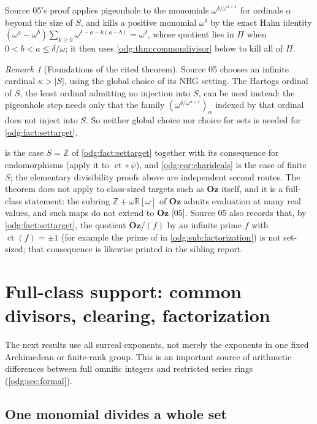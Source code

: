 \documentclass[11pt,oneside]{article}
\numberwithin{equation}{section}
\theoremstyle{definition}
\theoremstyle{remark}
\newtheorem{remark}[remark]{Remark}
\newcommand{\Oz}{\mathbf{Oz}}
\newcommand{\Z}{\mathbb Z}
\newcommand{\R}{\mathbb R}
\newcommand{\ct}{\operatorname{ct}}
\newcommand{\src}[1]{\textup{\textsf{\small[#1]}}}
\begin{document}
Source 05's proof applies pigeonhole to the monomials
$\omega^{\delta/\omega^{\alpha+1}}$ for ordinals $\alpha$ beyond the size of
$S$, and kills a positive monomial $\omega^\delta$ by the exact Hahn identity
$(\omega^a-\omega^b)\sum_{k\ge0}\omega^{\delta-a-k(a-b)}=\omega^\delta$, whose
quotient lies in $\Pi$ when $0<b<a\le\delta/\omega$; it then uses
\cref{odg:thm:commondivisor} below to kill all of $\Pi$.

\begin{remark}[Foundations of the cited theorem]\label{odg:rem:hartogs}
Source 05 chooses an infinite cardinal $\kappa>|S|$, using the global choice
of its NBG setting. The Hartogs ordinal of $S$, the least ordinal admitting no
injection into $S$, can be used instead: the pigeonhole step needs only that
the family $(\omega^{\delta/\omega^{\alpha+1}})_\alpha$ indexed by that ordinal
does not inject into $S$. So neither global choice nor choice for sets is
needed for \cref{odg:fact:settarget}.
\end{remark}

 is the case $S=\Z$ of \cref{odg:fact:settarget}
together with its consequence for endomorphisms (apply it to
$\ct\circ\psi$), and \cref{odg:cor:charideals} is the case of finite $S$;
the elementary divisibility proofs above are independent second routes. The
theorem does not apply to class-sized targets such as $\Oz$ itself, and it is
a full-class statement: the subring $\Z+\omega\R[\omega]$ of $\Oz$ admits
evaluation at many real values, and such maps do not extend to $\Oz$
\src{05}. Source 05 also records that, by \cref{odg:fact:settarget}, the
quotient $\Oz/(f)$ by an infinite prime $f$ with $\ct(f)=\pm1$ (for example
the prime of \cite[Theorem B]{LM} in \cref{odg:sub:factorization}) is not
set-sized; that consequence is likewise printed in the sibling report.

\section{Full-class support: common divisors, clearing, factorization}\label{odg:sec:class}

The next results use all surreal exponents, not merely the exponents in one
fixed Archimedean or finite-rank group. This is an important source of
arithmetic differences between full omnific integers and restricted series
rings (\cref{odg:sec:formal}).

\subsection{One monomial divides a whole set}
\end{document}
